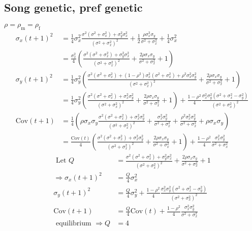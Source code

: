 \documentclass{article}
\newcommand{\x}[1]{\text{#1}}
\newcommand{\Cov}{\text{Cov}}
\begin{document}
\begin{landscape}
\subsection{Song genetic, pref genetic } 
$\rho=\rho_\x{m}=\rho_\x{f}$
\begin{align*}
\sigma_x(t+1)^2&=\frac{1}{4}\sigma_x^2\frac{\sigma^2(\sigma^2+\sigma_x^2)+\sigma_y^2\sigma_x^2}{(\sigma^2+\sigma_x^2)^2}+\frac{1}{2}\frac{\rho\sigma_x^3\sigma_y}{\sigma^2+\sigma_x^2}+\frac{1}{4}\sigma_x^2
\\&=\frac{\sigma_x^2}{4}\left(\frac{\sigma^2(\sigma^2+\sigma_x^2)+\sigma_y^2\sigma_x^2}{(\sigma^2+\sigma_x^2)^2}+\frac{2\rho\sigma_x\sigma_y}{\sigma^2+\sigma_x^2}+1\right)
\\\sigma_y(t+1)^2&=\frac{1}{4}\sigma_y^2\left(\frac{\sigma^2(\sigma^2+\sigma_x^2)+(1-\rho^2)\sigma_x^2(\sigma^2+\sigma_x^2)+\rho^2\sigma_x^2\sigma_y^2}{(\sigma^2+\sigma_x^2)^2}+\frac{2\rho\sigma_x\sigma_y}{\sigma^2+\sigma_x^2}+1\right)
\\&=\frac{1}{4}\sigma_y^2\left(\frac{\sigma^2(\sigma^2+\sigma_x^2)+\sigma_x^2\sigma_y^2}{(\sigma^2+\sigma_x^2)^2}+\frac{2\rho\sigma_x\sigma_y}{\sigma^2+\sigma_x^2}+1\right)+\frac{1-\rho^2}{4}\frac{\sigma_x^2\sigma_y^2(\sigma^2+\sigma_x^2-\sigma_y^2)}{(\sigma^2+\sigma_x^2)^2}
\\ \Cov(t+1)&=\frac{1}{4}\left(\rho\sigma_x\sigma_y\frac{\sigma^2(\sigma^2+\sigma_x^2)+\sigma_x^2\sigma_y^2}{(\sigma^2+\sigma_x^2)^2}+\frac{\sigma_x^2\sigma_y^2}{\sigma^2+\sigma_x^2}+\frac{\rho^2\sigma_x^2\sigma_y^2}{\sigma^2+\sigma_x^2}+\rho\sigma_x\sigma_y\right)
\\&=\frac{\Cov(t)}{4}\left(\frac{\sigma^2(\sigma^2+\sigma_x^2)+\sigma_x^2\sigma_y^2}{(\sigma^2+\sigma_x^2)^2}+\frac{2\rho\sigma_x\sigma_y}{\sigma^2+\sigma_x^2}+1\right)+\frac{1-\rho^2}{4}\frac{\sigma_x^2\sigma_y^2}{\sigma^2+\sigma_x^2}
\end{align*}
\begin{align*}
\text{ Let } Q&=\frac{\sigma^2(\sigma^2+\sigma_x^2)+\sigma_y^2\sigma_x^2}{(\sigma^2+\sigma_x^2)^2}+\frac{2\rho\sigma_x\sigma_y}{\sigma^2+\sigma_x^2}+1
\\ \Rightarrow \sigma_x(t+1)^2&=\frac{Q}{4}\sigma_x^2
\\ \sigma_y(t+1)^2&=\frac{Q}{4}\sigma_y^2+\frac{1-\rho^2}{4}\frac{\sigma_x^2\sigma_y^2(\sigma^2+\sigma_x^2-\sigma_y^2)}{(\sigma^2+\sigma_x^2)^2}
\\ \Cov(t+1)&=\frac{Q}{4}\Cov(t) +\frac{1-\rho^2}{4}\frac{\sigma_x^2\sigma_y^2}{\sigma^2+\sigma_x^2}
\\\text{ equilibrium } \Rightarrow Q & = 4 

\end{align*}
\end{landscape}
\end{document}
